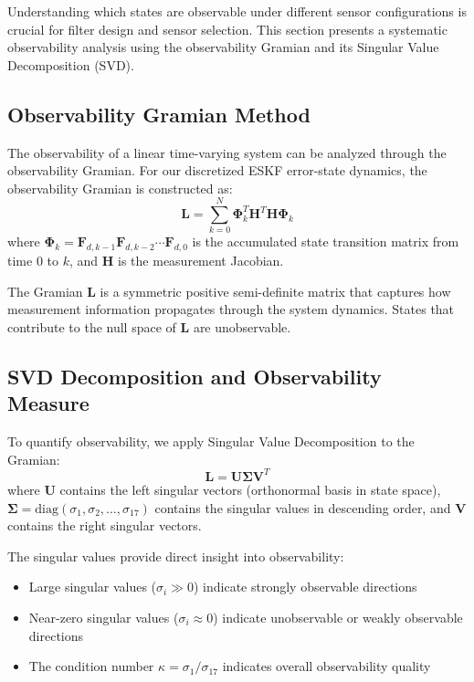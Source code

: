\documentclass[11pt,a4paper]{article}
\begin{document}
Understanding which states are observable under different sensor configurations is crucial for filter design and sensor selection. This section presents a systematic observability analysis using the observability Gramian and its Singular Value Decomposition (SVD).

\subsection{Observability Gramian Method}

The observability of a linear time-varying system can be analyzed through the observability Gramian. For our discretized ESKF error-state dynamics, the observability Gramian is constructed as:
\begin{equation}
    \mathbf{L} = \sum_{k=0}^{N} \bm{\Phi}_k^T \mathbf{H}^T \mathbf{H} \bm{\Phi}_k
\end{equation}
where $\bm{\Phi}_k = \mathbf{F}_{d,k-1} \mathbf{F}_{d,k-2} \cdots \mathbf{F}_{d,0}$ is the accumulated state transition matrix from time $0$ to $k$, and $\mathbf{H}$ is the measurement Jacobian.

The Gramian $\mathbf{L}$ is a symmetric positive semi-definite matrix that captures how measurement information propagates through the system dynamics. States that contribute to the null space of $\mathbf{L}$ are unobservable.

\subsection{SVD Decomposition and Observability Measure}

To quantify observability, we apply Singular Value Decomposition to the Gramian:
\begin{equation}
    \mathbf{L} = \mathbf{U} \bm{\Sigma} \mathbf{V}^T
\end{equation}
where $\mathbf{U}$ contains the left singular vectors (orthonormal basis in state space), $\bm{\Sigma} = \text{diag}(\sigma_1, \sigma_2, \ldots, \sigma_{17})$ contains the singular values in descending order, and $\mathbf{V}$ contains the right singular vectors.

The singular values provide direct insight into observability:
\begin{itemize}
    \item Large singular values ($\sigma_i \gg 0$) indicate strongly observable directions
    \item Near-zero singular values ($\sigma_i \approx 0$) indicate unobservable or weakly observable directions
    \item The condition number $\kappa = \sigma_1 / \sigma_{17}$ indicates overall observability quality
\end{itemize}
\end{document}
